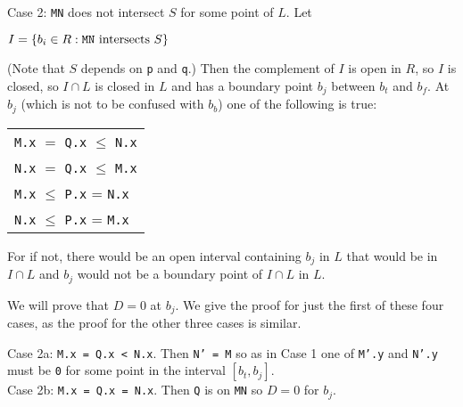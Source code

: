 \documentclass[12pt]{article}
\begin{document}
\begin{indpar}{0.3in}
Case 2: {\tt MN} does not intersect $S$ for some point of $L$.
Let
\begin{center}
$I = \{ b_i\in R: {\tt MN} \textrm{~intersects~} S\}$
\end{center}
(Note that $S$ depends on {\tt p} and {\tt q}.)
Then the complement of $I$ is open in $R$, so $I$ is closed, so
$I\cap L$ is closed in $L$ and
has a boundary point $b_j$ between $b_t$ and $b_f$.  At $b_j$
(which is not to be confused with $b_b$)
one of the following is true:
\begin{center}
\begin{tabular}{l}
{\tt M.x} $=$ {\tt Q.x} $\leq$ {\tt N.x} \\
{\tt N.x} $=$ {\tt Q.x} $\leq$ {\tt M.x} \\
{\tt M.x} $\leq$ {\tt P.x} = {\tt N.x} \\
{\tt N.x} $\leq$ {\tt P.x} = {\tt M.x} \\
\end{tabular}
\end{center}
For if not, there would be an open interval containing $b_j$ in $L$
that would be in $I\cap L$ and $b_j$ would not be a boundary
point of $I\cap L$ in $L$.

We will prove that $D=0$ at $b_j$.  We give the proof
for just the first of these four cases,
as the proof for the other three cases is similar.
	
\begin{indpar}{0.3in}
Case 2a: {\tt M.x = Q.x < N.x}.  Then
{\tt N' = M} so as in Case 1 one of {\tt M'.y} and {\tt N'.y}
must be {\tt 0} for some point in the interval $[b_t,b_j]$.
\\
Case 2b: {\tt M.x = Q.x = N.x}.  Then {\tt Q} is on {\tt MN} so
$D=0$ for $b_j$.
\end{indpar}
\end{indpar}

\newpage
\end{document}
